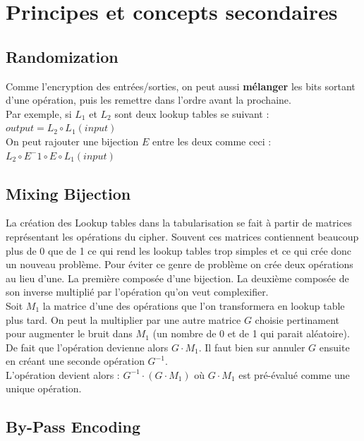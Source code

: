 \documentclass[a4paper,12pt]{article}
\begin{document}
\section{Principes et concepts secondaires}

\subsection{Randomization}

Comme l'encryption des entrées/sorties, on peut aussi \textbf{mélanger} les bits sortant d'une opération, puis les remettre dans l'ordre avant la prochaine.\\

Par exemple, si $L_1$ et $L_2$ sont deux lookup tables se suivant :\\
$output = L_2 \circ L_1(input)$\\
 On peut rajouter une bijection $E$ entre les deux comme ceci :\\
$L_2 \circ E^-1 \circ E \circ L_1(input)$


\subsection{Mixing Bijection}

La création des Lookup tables dans la tabularisation se fait à partir de matrices représentant les opérations du cipher. Souvent ces matrices contiennent beaucoup plus de 0 que de 1 ce qui rend les lookup tables trop simples et ce qui crée donc un nouveau problème. Pour éviter ce genre de problème on crée deux opérations au lieu d'une. La première composée d'une bijection. La deuxième composée de son inverse multiplié par l'opération qu'on veut complexifier.\\
Soit $M_1$ la matrice d'une des opérations que l'on transformera en lookup table plus tard. On peut la multiplier par une autre matrice $G$ choisie pertinament pour augmenter le bruit dans $M_1$ (un nombre de 0 et de 1 qui parait aléatoire). De fait que l'opération devienne alors $G \cdot M_1$. Il faut bien sur annuler $G$ ensuite en créant une seconde opération $G^{-1}$.\\
L'opération devient alors : $G^{-1} \cdot (G \cdot M_1)$ où $G \cdot M_1$ est pré-évalué comme une unique opération.


\subsection{By-Pass Encoding}
\end{document}
